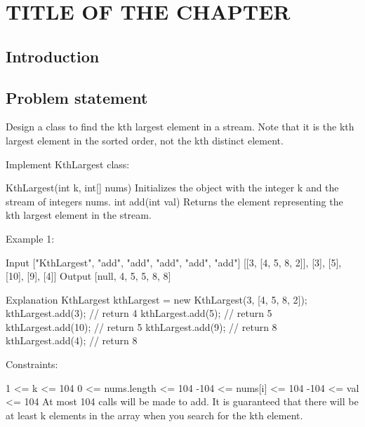 %

\chapter{TITLE OF THE CHAPTER}
\label{ch:kth_largest_in_stream}
\section*{Introduction}

\section{Problem statement}
\begin{exercise}

	Design a class to find the kth largest element in a stream. Note that it is the kth largest element in the sorted order, not the kth distinct element.

	Implement KthLargest class:
	
	KthLargest(int k, int[] nums) Initializes the object with the integer k and the stream of integers nums.
	int add(int val) Returns the element representing the kth largest element in the stream.
	 
	
	Example 1:
	
	Input
	["KthLargest", "add", "add", "add", "add", "add"]
	[[3, [4, 5, 8, 2]], [3], [5], [10], [9], [4]]
	Output
	[null, 4, 5, 5, 8, 8]
	
	Explanation
	KthLargest kthLargest = new KthLargest(3, [4, 5, 8, 2]);
	kthLargest.add(3);   // return 4
	kthLargest.add(5);   // return 5
	kthLargest.add(10);  // return 5
	kthLargest.add(9);   // return 8
	kthLargest.add(4);   // return 8
	 
	
	Constraints:
	
	1 <= k <= 104
	0 <= nums.length <= 104
	-104 <= nums[i] <= 104
	-104 <= val <= 104
	At most 104 calls will be made to add.
	It is guaranteed that there will be at least k elements in the array when you search for the kth element.


\begin{example}
	\hfill \
	
\end{example}

\begin{example}
	\hfill \
	
\end{example}

\end{exercise}


